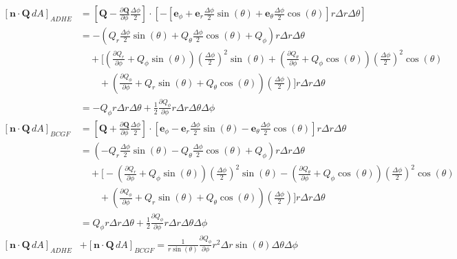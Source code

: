 \documentclass[a4paper]{article}
\begin{document}
\begin{align*}
	\!\left[ \pmb{n} \cdot \pmb{Q} \, dA \right]_{ADHE} & = \!\left[ \pmb{Q} - \frac{\partial \pmb{Q}}{\partial \phi}\frac{\Delta \phi}{2} \right] \cdot \!\left[ -\!\left[ \pmb{e}_{\phi} + \pmb{e}_{r}\frac{\Delta \phi}{2}\sin\!\left(\theta\right) + \pmb{e}_{\theta}\frac{\Delta \phi}{2}\cos\!\left(\theta\right) \right]r \Delta r \Delta \theta \right] \\
							    & = -\!\left( Q_{r}\frac{\Delta \phi}{2}\sin\!\left(\theta\right) + Q_{\theta}\frac{\Delta \phi}{2}\cos\!\left(\theta\right) + Q_{\phi} \right)r \Delta r \Delta \theta \\
							    & \quad + \biggl[ \!\left( \frac{\partial Q_{r}}{\partial \phi} + Q_{\phi}\sin\!\left(\theta\right) \right)\!\left( \frac{\Delta \phi}{2} \right)^{2}\sin\!\left(\theta\right) + \!\left( \frac{\partial Q_{\theta}}{\partial \phi} + Q_{\phi}\cos\!\left(\theta\right) \right)\!\left( \frac{\Delta \phi}{2} \right)^{2}\cos\!\left(\theta\right) \\
							    & \qquad + \!\left( \frac{\partial Q_{\phi}}{\partial \phi} + Q_{r}\sin\!\left(\theta\right) + Q_{\theta}\cos\!\left(\theta\right) \right)\!\left( \frac{\Delta \phi}{2} \right) \biggr]r \Delta r \Delta \theta \\
							    & = -Q_{\phi}r \Delta r \Delta \theta + \frac{1}{2}\frac{\partial Q_{\phi}}{\partial \phi}r \Delta r \Delta \theta \Delta \phi  \\
	\!\left[ \pmb{n} \cdot \pmb{Q} \, dA \right]_{BCGF} & = \!\left[ \pmb{Q} + \frac{\partial \pmb{Q}}{\partial \phi}\frac{\Delta \phi}{2} \right] \cdot \!\left[ \pmb{e}_{\phi} - \pmb{e}_{r}\frac{\Delta \phi}{2}\sin\!\left(\theta\right) - \pmb{e}_{\theta}\frac{\Delta \phi}{2}\cos\!\left(\theta\right) \right]r \Delta r \Delta \theta \\
							    & = \!\left( -Q_{r}\frac{\Delta \phi}{2}\sin\!\left(\theta\right) - Q_{\theta}\frac{\Delta \phi}{2}\cos\!\left(\theta\right) + Q_{\phi} \right)r \Delta r \Delta \theta \\
							    & \quad + \biggl[ -\!\left( \frac{\partial Q_{r}}{\partial \phi} + Q_{\phi}\sin\!\left(\theta\right) \right)\!\left( \frac{\Delta \phi}{2} \right)^{2}\sin\!\left(\theta\right) - \!\left( \frac{\partial Q_{\theta}}{\partial \phi} + Q_{\phi}\cos\!\left(\theta\right) \right)\!\left( \frac{\Delta \phi}{2} \right)^{2}\cos\!\left(\theta\right) \\
							    & \qquad + \!\left( \frac{\partial Q_{\phi}}{\partial \phi} + Q_{r}\sin\!\left(\theta\right) + Q_{\theta}\cos\!\left(\theta\right) \right)\!\left( \frac{\Delta \phi}{2} \right) \biggr]r \Delta r \Delta \theta \\
							    & = Q_{\phi}r \Delta r \Delta \theta + \frac{1}{2}\frac{\partial Q_{\phi}}{\partial \phi}r \Delta r \Delta \theta \Delta \phi  \\
	\!\left[ \pmb{n} \cdot \pmb{Q} \, dA \right]_{ADHE} & + \!\left[ \pmb{n} \cdot \pmb{Q} \, dA \right]_{BCGF} = \boxed{\frac{1}{r \sin\!\left(\theta\right)}\frac{\partial Q_{\phi}}{\partial \phi}r^{2} \Delta r\sin\!\left(\theta\right) \Delta \theta \Delta \phi}
\end{align*}
\end{document}
